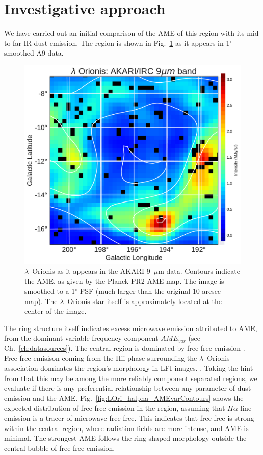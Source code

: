 \section{Investigative approach}
  We have carried out an initial comparison of the AME of this region with its mid to far-IR dust emission. The region is shown in Fig.~\ref{fig:orionis-akari9} as it appears in 1$^{\circ}$-smoothed A9 data.
      \begin{figure}
        \includegraphics[width=\textwidth]{../Plots/LOri_akari9_AMEcont_1dres.pdf}
        \centering
        \caption{$\lambda$~Orionis as it appears in the AKARI 9~$\mu$m data. Contours indicate the AME, as given by the Planck PR2 AME map. The image is smoothed to a 1$^{\circ}$ PSF (much larger than the original 10 arcsec map). The $\lambda$~Orionis star itself is approximately located at the center of the image.}
        \label{fig:orionis-akari9}
      \end{figure}
   The ring structure itself indicates excess microwave emission attributed to AME, from the dominant variable frequency component $AME_{var}$ (see Ch.~\ref{ch:datasources}). The central region is dominated by free-free emission \citep{aran09, koenig15}. Free-free emisison coming from the Hii phase surrounding the $\lambda$~Orionis association dominates the region's morphology in LFI images. \citep{planck15XXV}. Taking the hint from \cite{planck15XXV} that this may be among the more reliably component separated regions, we evaluate if there is any preferential relationship between any parameter of dust emission and the AME. Fig.~\ref{fig:LOri_halpha_AMEvarContours} shows the expected distribution of free-free emission in the region, assuming that $H\alpha$ line emission is a tracer of microwave free-free. This indicates that free-free is strong within the central region, where radiation fields are more intense, and AME is minimal. The strongest AME follows the ring-shaped morphology outside the central bubble of free-free emission.
